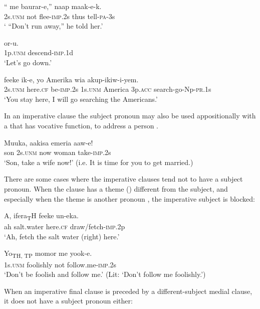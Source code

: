 \ea%
\label{ex:3:x1771}
\gll `` me baurar-e,'' naap maak-e-k. \\
2s.\textsc{unm} not flee-\textsc{imp}.2s thus tell-\textsc{pa}-3s\\
\glt` ``Don't run away,'' he told her.'
\z

\ea%
\label{ex:3:x1772}
\gll {} or-u. \\
1p.\textsc{unm} descend-\textsc{imp}.1d\\
\glt`Let's go down.'
\z

\ea%
\label{ex:3:x1780}
\gll {} feeke ik-e, yo Amerika wia akup-ikiw-i-yem.\\
2s.\textsc{unm} here.\textsc{cf} be-\textsc{imp}.2s 1s.\textsc{unm} America 3p.\textsc{acc} search-go-Np-\textsc{pr}.1s\\
\glt`You stay here, I will go searching the Americans.'
\z

In an imperative clause the subject pronoun may also be used appositionally with a  that has vocative function, to address a person . 

\ea%
\label{ex:3:x627}
\gll Muuka,  aakisa emeria aaw-e! \\
son 2s.\textsc{unm} now woman take-\textsc{imp}.2s\\
\glt`Son, take a wife now!' (i.e. It is time for you to get married.)
\z

There are some cases where the imperative clauses tend not to have a subject pronoun. When the clause has a theme () different from the subject, and especially when the theme is another pronoun , the imperative subject is blocked:

\ea%
\label{ex:3:x1773}
\gll A, ifera\textsubscript{T}H feeke un-eka. \\
ah salt.water here.\textsc{cf} draw/fetch-\textsc{imp}.2p\\
\glt`Ah, fetch the salt water (right) here.'
\z

\ea%
\label{ex:3:x1774}
\gll Yo\textsubscript{TH, TP} momor me yook-e. \\
1s.\textsc{unm} foolishly not follow.me-\textsc{imp}.2s\\
\glt`Don't be foolish and follow me.' (Lit: `Don't follow me foolishly.')
\z

When an imperative final clause is preceded by a different-subject medial clause, it does not have a subject pronoun either:

